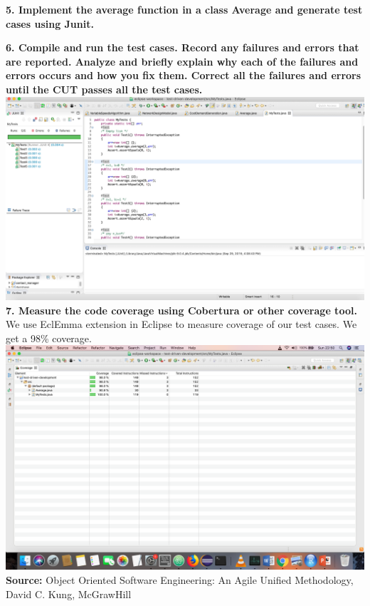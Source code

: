 \documentclass[12pt,letterpaper,titlepage,en-US]{article}
\begin{document}
  
  \textbf{5. Implement the average function in a class Average and generate test cases using Junit.} 
  


  

    \textbf{6.  Compile and run the test cases. Record any failures and errors that are reported. Analyze and briefly explain why each of the failures and errors occurs and how you fix them. Correct all the failures and errors until the CUT passes all the test cases. }\\
     
        \includegraphics[scale=0.3]{testcases.png}\\
        
        
   \textbf{7. Measure the code coverage using Cobertura or other coverage tool.  }\\
We use EclEmma extension in Eclipse to measure coverage of our test cases. We get a 98\% coverage.\\
    \includegraphics[scale=0.3]{coverage.png}\\
 
  


    

    
    


\textbf{Source:} Object Oriented Software Engineering: An Agile Unified Methodology, David C. Kung, McGrawHill
\end{document}
